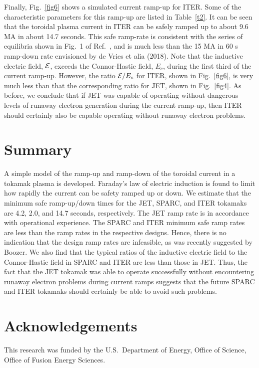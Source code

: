 \documentclass[12pt,prb,aps]{revtex4-1}
\begin{document}
Finally, Fig.~\ref{fig6} shows a simulated current ramp-up for ITER. Some of the characteristic  parameters for this ramp-up are listed in Table~\ref{t2}. 
It can be seen that the toroidal plasma current in ITER can be safely ramped up to about 9.6 MA in about 14.7 seconds. This safe ramp-rate is 
consistent with the series of equilibria shown in Fig.~1 of Ref.~, and is much less than the 15 MA in 60 s ramp-down rate envisioned by de Vries et alia (2018).\cite{deVries}
Note that the inductive electric field, ${\cal E}$,  exceeds the Connor-Hastie field, $E_c$,  during the first third of the current ramp-up. However,  the ratio ${\cal E}/E_c$ for ITER, 
shown  in Fig.~\ref{fig6}, is very much less than that the corresponding ratio for JET,  shown in Fig.~\ref{fig4}. As before, we conclude that if JET was capable of
operating without dangerous levels of runaway electron generation during the current ramp-up, then ITER
should certainly also be capable operating without runaway electron problems.  

\section{Summary}
A simple model of the ramp-up and ramp-down of the toroidal current in a tokamak plasma is developed. Faraday's law of electric induction is found to 
limit how rapidly the current can be safety ramped up or down. We estimate that the minimum safe ramp-up/down times for the JET, SPARC, and
ITER tokamaks are 4.2, 2.0, and 14.7 seconds, respectively. The JET ramp rate is in accordance with operational experience. The SPARC
and ITER minimum safe ramp rates are less than the ramp rates in the respective designs. Hence, there is no indication that the design ramp rates are infeasible, as was recently 
suggested by Boozer.\cite{boozer}
We also find that the typical ratios of the inductive electric field
to the Connor-Hastie field in SPARC and ITER are less than those in JET. Thus, the fact that the JET tokamak was able to operate successfully
without encountering runaway electron problems during  current ramps suggests that the future SPARC and ITER tokamaks should certainly be able to
avoid such problems. 

\section*{Acknowledgements}
This research was funded by the  U.S.\ Department of Energy, Office of Science, Office of Fusion Energy Sciences.
\end{document}
